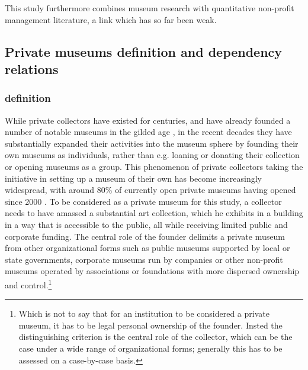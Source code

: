 \documentclass[12pt]{article}
\begin{document}
This study furthermore combines museum research with quantitative non-profit management literature, a link which has so far been weak. 
\subsection*{Private museums definition and dependency relations}



\subsubsection*{definition}

\bigbreak
\noindent
While private collectors have existed for centuries, and have already founded a number of notable museums in the gilded age \parencite{diMaggio_1982_boston,Higonnet_2003_sight,Duncan_1995_civilizing}, in the recent decades they have substantially expanded their activities into the museum sphere by founding their own museums as individuals, rather than e.g. loaning or donating their collection or opening museums as a group.
This phenomenon of private collectors taking the initiative in setting up a museum of their own has become increasingly widespread, with around 80\% of currently open private museums having opened since 2000 \parencite{Velthuis_etal_2023_boom}.
To be considered as a private museum for this study, a collector needs to have amassed a substantial art collection, which he exhibits in a building in a way that is accessible to the public, all while receiving limited public and corporate funding.
The central role of the founder delimits a private museum from other organizational forms such as public museums supported by local or state governments, corporate museums run by companies or other non-profit museums operated by associations or foundations with more dispersed ownership and control.\footnote{Which is not to say that for an institution to be considered a private museum, it has to be legal personal ownership of the founder. Insted the distinguishing criterion is the central role of the collector, which can be the case under a wide range of organizational forms; generally this has to be assessed on a case-by-case basis.}
\end{document}
